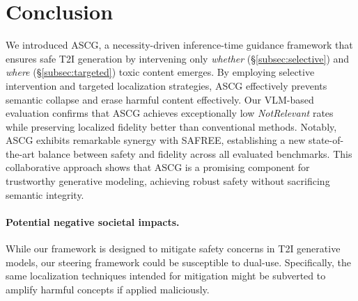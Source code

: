 \section{Conclusion}

We introduced ASCG, a necessity-driven inference-time guidance framework that ensures safe T2I generation by intervening only \textit{whether} (\S\ref{subsec:selective}) and \textit{where} (\S\ref{subsec:targeted}) toxic content emerges.
By employing selective intervention and targeted localization strategies, ASCG effectively prevents semantic collapse and erase harmful content effectively.
Our VLM-based evaluation confirms that ASCG achieves exceptionally low \emph{NotRelevant} rates while preserving localized fidelity better than conventional methods.
Notably, ASCG exhibits remarkable synergy with SAFREE, establishing a new state-of-the-art balance between safety and fidelity across all evaluated benchmarks.
This collaborative approach shows that ASCG is a promising component for trustworthy generative modeling, achieving robust safety without sacrificing semantic integrity.

\paragraph{Potential negative societal impacts.}
While our framework is designed to mitigate safety concerns in T2I generative models, our steering framework could be susceptible to dual-use.
Specifically, the same localization techniques intended for mitigation might be subverted to amplify harmful concepts if applied maliciously.